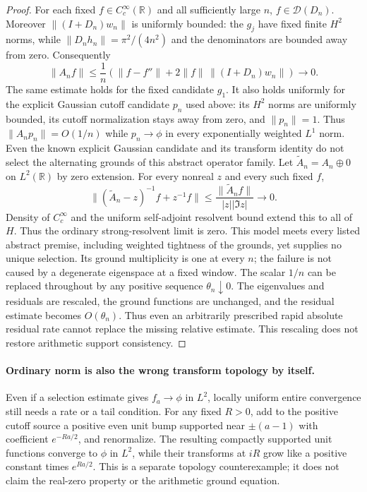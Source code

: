\documentclass[11pt]{article}
\theoremstyle{remark}
\begin{document}
\begin{proof}
For each fixed $f\in C_c^\infty(\mathbb R)$ and all sufficiently large
$n$, $f\in\mathcal D(D_n)$. Moreover
$\|(I+D_n)w_n\|$ is uniformly bounded: the $g_j$ have fixed finite
$H^2$ norms, while $\|D_nh_n\|=\pi^2/(4n^2)$ and the denominators
are bounded away from zero. Consequently
\[
 \|A_nf\|\le\frac1n\left(\|f-f''\|
        +2\|f\|\,\|(I+D_n)w_n\|\right)\longrightarrow0.
\]
The same estimate holds for the fixed candidate $g_1$. It also holds
uniformly for the explicit Gaussian cutoff candidate $p_n$ used above:
its $H^2$ norms are uniformly bounded, its cutoff normalization stays
away from zero, and $\|p_n\|=1$. Thus $\|A_np_n\|=O(1/n)$ while
$p_n\to\phi$ in every exponentially weighted $L^1$ norm. Even the
known explicit Gaussian candidate and its transform identity do not
select the alternating grounds of this abstract operator family.
Let $\widetilde A_n=A_n\oplus0$ on $L^2(\mathbb R)$ by zero extension.
For every nonreal $z$ and every such fixed $f$,
\[
 \|(\widetilde A_n-z)^{-1}f+z^{-1}f\|
 \le\frac{\|\widetilde A_nf\|}{|z||\Im z|}\to0.
\]
Density of $C_c^\infty$ and the uniform self-adjoint resolvent bound
extend this to all of $H$. Thus the ordinary strong-resolvent limit
is zero. This model meets every listed abstract premise, including
weighted tightness of the grounds, yet supplies no unique selection.
Its ground multiplicity is one at every $n$; the failure is not caused
by a degenerate eigenspace at a fixed window.
The scalar $1/n$ can be replaced throughout by any positive sequence
$\theta_n\downarrow0$. The eigenvalues and residuals are rescaled,
the ground functions are unchanged, and the residual estimate becomes
$O(\theta_n)$. Thus even an arbitrarily prescribed rapid absolute
residual rate cannot replace the missing relative estimate. This
rescaling does not restore arithmetic support consistency.
\end{proof}


\paragraph{Ordinary norm is also the wrong transform topology by itself.}
Even if a selection estimate gives $f_a\to\phi$ in $L^2$, locally
uniform entire convergence still needs a rate or a tail condition.
For any fixed $R>0$, add to the positive cutoff source a positive even
unit bump supported near $\pm(a-1)$ with coefficient $e^{-Ra/2}$,
and renormalize. The resulting compactly supported unit functions
converge to $\phi$ in $L^2$, while their transforms at $iR$ grow like
a positive constant times $e^{Ra/2}$. This is a separate topology
counterexample; it does not claim the real-zero property or the
arithmetic ground equation.
\end{document}
